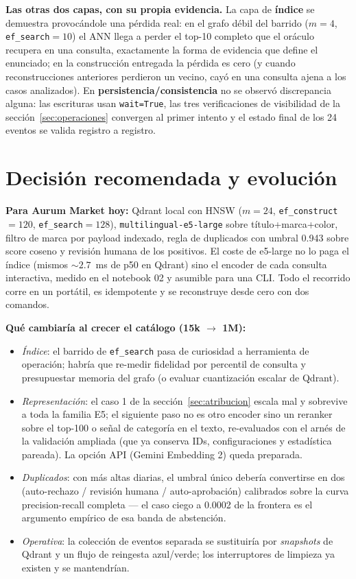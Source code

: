 \documentclass[10pt,twocolumn]{article}
\newcommand{\code}[1]{\texttt{\small #1}}
\begin{document}
\textbf{Las otras dos capas, con su propia evidencia.} La capa de
\textbf{índice} se demuestra provocándole una pérdida real: en el grafo
débil del barrido ($m{=}4$, \code{ef\_search}${=}10$) el ANN llega a perder
el top-10 completo que el oráculo recupera en una consulta, exactamente la
forma de evidencia que define el enunciado; en la construcción entregada la
pérdida es cero (y cuando reconstrucciones anteriores perdieron un vecino,
cayó en una consulta ajena a los casos analizados). En \textbf{persistencia/consistencia} no se observó
discrepancia alguna: las escrituras usan \code{wait=True}, las tres
verificaciones de visibilidad de la sección~\ref{sec:operaciones} convergen
al primer intento y el estado final de los 24 eventos se valida registro a
registro.

\section{Decisión recomendada y evolución}
\label{sec:evolucion}

\textbf{Para Aurum Market hoy:} Qdrant local con HNSW ($m{=}24$,
\code{ef\_construct}${=}120$, \code{ef\_search}${=}128$),
\code{multilingual-e5-large} sobre título+marca+color, filtro de marca por
payload indexado, regla de duplicados con umbral 0.943 sobre score coseno y
revisión humana de los positivos. El coste de e5-large no lo paga el índice
(mismos ${\sim}2.7$~ms de p50 en Qdrant) sino el encoder de cada consulta
interactiva, medido en el notebook 02 y asumible para una CLI. Todo el
recorrido corre en un portátil, es idempotente y se reconstruye desde cero
con dos comandos.

\textbf{Qué cambiaría al crecer el catálogo (15k $\rightarrow$ 1M):}

\begin{itemize}
  \item \emph{Índice}: el barrido de \code{ef\_search} pasa de curiosidad a
  herramienta de operación; habría que re-medir fidelidad por percentil de
  consulta y presupuestar memoria del grafo (o evaluar cuantización escalar
  de Qdrant).
  \item \emph{Representación}: el caso 1 de la
  sección~\ref{sec:atribucion} escala mal y sobrevive a toda la familia E5;
  el siguiente paso no es otro encoder sino un reranker sobre el top-100 o
  señal de categoría en el texto, re-evaluados con el arnés de la validación
  ampliada (que ya conserva IDs, configuraciones y estadística pareada). La
  opción API (Gemini Embedding 2) queda preparada.
  \item \emph{Duplicados}: con más altas diarias, el umbral único debería
  convertirse en dos (auto-rechazo / revisión humana / auto-aprobación)
  calibrados sobre la curva precision-recall completa --- el caso ciego a
  0.0002 de la frontera es el argumento empírico de esa banda de abstención.
  \item \emph{Operativa}: la colección de eventos separada se sustituiría
  por \emph{snapshots} de Qdrant y un flujo de reingesta azul/verde; los
  interruptores de limpieza ya existen y se mantendrían.
\end{itemize}
\end{document}
